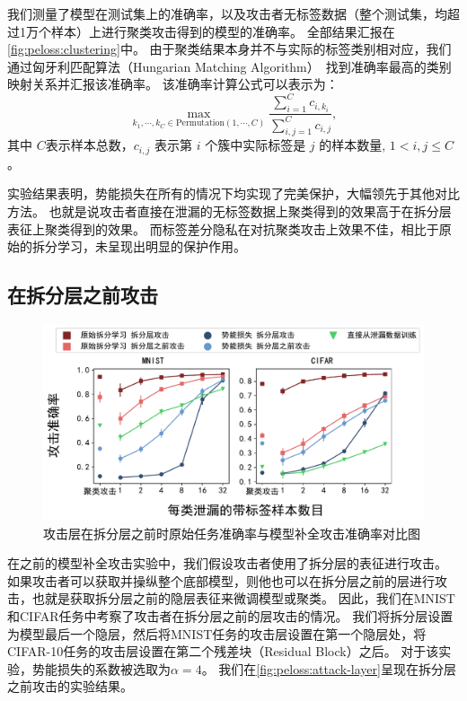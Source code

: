我们测量了模型在测试集上的准确率，以及攻击者无标签数据（整个测试集，均超过1万个样本）上进行聚类攻击得到的模型的准确率。
全部结果汇报在\autoref{fig:peloss:clustering}中。
%
由于聚类结果本身并不与实际的标签类别相对应，我们通过匈牙利匹配算法（Hungarian Matching Algorithm）~\cite{kuhn_1955_hungarian}找到准确率最高的类别映射关系并汇报该准确率。
该准确率计算公式可以表示为：
\begin{equation}
    \max\limits_{k_1,\cdots,k_C \in \text{Permutation}(1,\cdots,C)} \dfrac{\sum_{i=1}^C c_{i,k_i}}{\sum_{i,j=1}^C c_{i,j}},
\end{equation}
其中 $C$表示样本总数，$c_{i,j}$ 表示第 $i$ 个簇中实际标签是 $j$ 的样本数量, $1 < i, j \le C$。

%
实验结果表明，势能损失在所有的情况下均实现了完美保护，大幅领先于其他对比方法。
也就是说攻击者直接在泄漏的无标签数据上聚类得到的效果高于在拆分层表征上聚类得到的效果。
%
而标签差分隐私在对抗聚类攻击上效果不佳，相比于原始的拆分学习，未呈现出明显的保护作用。


\subsection{在拆分层之前攻击}
\begin{figure}[h!]
    \centering
    \includegraphics[width=0.85\linewidth]{Z_Resources/peloss_attack-layer}
    \caption{攻击层在拆分层之前时原始任务准确率与模型补全攻击准确率对比图}
    \label{fig:peloss:attack-layer}
\end{figure}

在之前的模型补全攻击实验中，我们假设攻击者使用了拆分层的表征进行攻击。
如果攻击者可以获取并操纵整个底部模型，则他也可以在拆分层之前的层进行攻击，也就是获取拆分层之前的隐层表征来微调模型或聚类。
%
因此，我们在MNIST和CIFAR任务中考察了攻击者在拆分层之前的层攻击的情况。
我们将拆分层设置为模型最后一个隐层，然后将MNIST任务的攻击层设置在第一个隐层处，将CIFAR-10任务的攻击层设置在第二个残差块（Residual Block）之后。
%
对于该实验，势能损失的系数被选取为$\alpha=4$。
%
我们在\autoref{fig:peloss:attack-layer}呈现在拆分层之前攻击的实验结果。

